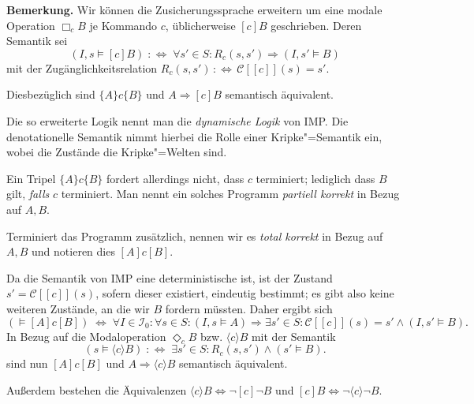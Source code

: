 \documentclass[8pt,fleqn,aspectratio=169]{beamer}
\newcommand{\strong}[1]{\textsf{\textbf{#1}}}
\newcommand{\parspace}{\vspace{0.8em}}
\newcommand{\qb}[1]{[\!\![#1]\!\!]}
\newcommand{\evC}{\mathcal C}
\begin{document}
\begin{frame}
\strong{Bemerkung.}
Wir können die Zusicherungssprache erweitern um eine modale Operation
$\Box_c B$ je Kommando $c$, üblicherweise $[c]B$ geschrieben.\pause{} Deren Semantik sei
\[(I,s\models [c]B) \;:\Leftrightarrow\; \forall s'\in S\colon R_c(s,s')\Rightarrow (I,s'\models B)\]
mit der Zugänglichkeitsrelation $R_c(s,s')\,:\Leftrightarrow\, \evC\qb{c}(s)=s'$.\pause

\parspace
Diesbezüglich sind $\{A\}c\{B\}$ und $A\Rightarrow [c]B$ semantisch äquivalent.\pause

\parspace
Die so erweiterte Logik nennt man die \emph{dynamische Logik} von IMP.
Die denotationelle Semantik nimmt hierbei die Rolle einer Kripke"=Semantik
ein, wobei die Zustände die Kripke"=Welten sind.
\end{frame}

\begin{frame}
Ein Tripel $\{A\}c\{B\}$ fordert allerdings nicht, dass $c$ terminiert;
lediglich dass $B$ gilt, \emph{falls} $c$ terminiert. Man nennt ein
solches Programm \emph{partiell korrekt} in Bezug auf $A,B$.\pause

\parspace
Terminiert das Programm zusätzlich, nennen wir es \emph{total korrekt}
in Bezug auf $A,B$ und notieren dies $[A]c[B]$.\pause

\parspace
Da die Semantik von IMP eine deterministische ist, ist der Zustand $s'=\evC\qb{c}(s)$,
sofern dieser existiert, eindeutig bestimmt; es gibt also keine weiteren Zustände,
an die wir $B$ fordern müssten. Daher ergibt sich
\[(\models [A]c [B]) \;\Leftrightarrow\; \forall I\in\mathcal I_0\colon\forall s\in S\colon
(I,s\models A)\Rightarrow\exists s'\in S\colon \evC\qb{c}(s)=s'\land (I,s'\models B).\]\pause
In Bezug auf die Modaloperation $\Diamond_c B$ bzw. $\langle c\rangle B$ mit der Semantik
\[(s\models\langle c\rangle B)\;:\Leftrightarrow\; \exists s'\in S\colon R_c(s,s')\land (s'\models B).\]
sind nun $[A]c[B]$ und $A\Rightarrow\langle c\rangle B$ semantisch äquivalent.

\parspace
{\footnotesize Außerdem bestehen die Äquivalenzen
$\langle c\rangle B \Leftrightarrow \lnot [c]\lnot B$
und $[c]B\Leftrightarrow\lnot\langle c\rangle\lnot B$.}
\end{frame}
\end{document}
